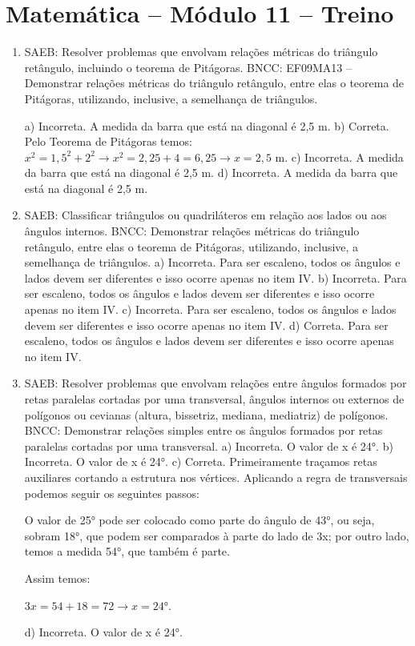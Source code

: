\section*{Matemática – Módulo 11 – Treino}

\begin{enumerate}
\item
SAEB: Resolver problemas que envolvam relações métricas do triângulo retângulo, incluindo o teorema de Pitágoras.
BNCC: EF09MA13 -- Demonstrar relações métricas do triângulo retângulo, entre elas o teorema de Pitágoras, utilizando, inclusive, a semelhança de triângulos.

a) Incorreta. A medida da barra que está na diagonal é 2,5 m.
b) Correta. Pelo Teorema de Pitágoras temos: $x^2 = 1,5^2 + 2^2 \rightarrow 
x^2 = 2,25 + 4 = 6,25 \rightarrow x = 2,5$ m.
c) Incorreta. A medida da barra que está na diagonal é 2,5 m.
d) Incorreta. A medida da barra que está na diagonal é 2,5 m.

\item
SAEB: Classificar triângulos ou quadriláteros em relação aos lados ou aos ângulos internos.
BNCC: Demonstrar relações métricas do triângulo retângulo, entre elas o teorema de Pitágoras, utilizando, inclusive, a semelhança de triângulos.
a) Incorreta. Para ser escaleno, todos os ângulos e lados devem ser diferentes e isso
ocorre apenas no item IV. 
b) Incorreta. Para ser escaleno, todos os ângulos e lados devem ser diferentes e isso
ocorre apenas no item IV. 
c) Incorreta. Para ser escaleno, todos os ângulos e lados devem ser diferentes e isso
ocorre apenas no item IV. 
d) Correta. Para ser escaleno, todos os ângulos e lados devem ser diferentes e isso
ocorre apenas no item IV.

\item
SAEB: Resolver problemas que envolvam relações entre ângulos formados por retas paralelas cortadas por uma transversal, ângulos internos ou externos de polígonos ou cevianas (altura, bissetriz, mediana, mediatriz) de polígonos.
BNCC: Demonstrar relações simples entre os ângulos formados por retas paralelas cortadas por uma transversal.
a) Incorreta. O valor de x é 24°.
b) Incorreta. O valor de x é 24°.
c) Correta. 
Primeiramente traçamos retas auxiliares cortando a estrutura nos
vértices. Aplicando a regra de transversais podemos seguir os seguintes
passos:

O valor de 25° pode ser colocado como parte do ângulo de 43°, ou seja,
sobram 18°, que podem ser comparados à parte do lado de 3x; por outro lado,
temos a medida 54°, que também é parte.

Assim temos:

$3x = 54 + 18 = 72 \rightarrow x = 24$°.

d) Incorreta. O valor de x é 24°.
\end{enumerate}

